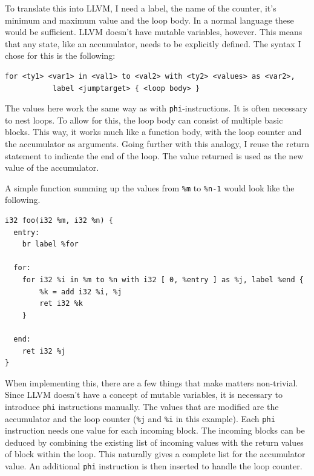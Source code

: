 \documentclass[a4paper,bibliography=totocnumbered,parskip,headsepline]{scrbook}
\begin{document}
To translate this into LLVM, I need a label, the name of the counter, it's minimum and maximum value and the loop body.
In a normal language these would be sufficient.
LLVM doesn't have mutable variables, however.
This means that any state, like an accumulator, needs to be explicitly defined.
The syntax I chose for this is the following:

\begin{lstlisting}[numbers=none]
for <ty1> <var1> in <val1> to <val2> with <ty2> <values> as <var2>,
           label <jumptarget> { <loop body> }
\end{lstlisting}

The values here work the same way as with \lstinline!phi!-instructions.
It is often necessary to nest loops.
To allow for this, the loop body can consist of multiple basic blocks.
This way, it works much like a function body, with the loop counter and the accumulator as arguments.
Going further with this analogy, I reuse the return statement to indicate the end of the loop.
The value returned is used as the new value of the accumulator.

A simple function summing up the values from \lstinline{%m} to \lstinline{%n-1} would look like the following.
\begin{lstlisting}
i32 foo(i32 %m, i32 %n) {
  entry:
    br label %for

  for:
    for i32 %i in %m to %n with i32 [ 0, %entry ] as %j, label %end {
        %k = add i32 %i, %j
        ret i32 %k
    }

  end:
    ret i32 %j
}
\end{lstlisting}

When implementing this, there are a few things that make matters non-trivial.
Since LLVM doesn't have a concept of mutable variables, it is necessary to introduce \lstinline{phi} instructions manually.
The values that are modified are the accumulator and the loop counter (\lstinline!%j! and \lstinline!%i! in this example).
Each \lstinline{phi} instruction needs one value for each incoming block.
The incoming blocks can be deduced by combining the existing list of incoming values with the return values of block within the loop.
This naturally gives a complete list for the accumulator value.
An additional \lstinline{phi} instruction is then inserted to handle the loop counter.
\end{document}
